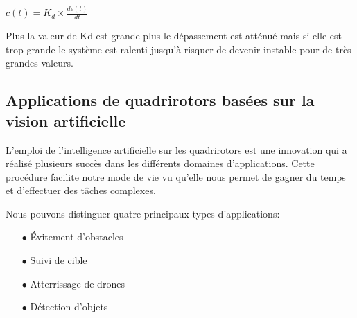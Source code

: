 $ c(t)  = K_d\times\frac{d\epsilon(t)}{dt}$


Plus la valeur de Kd est grande plus le dépassement est atténué mais si elle est trop grande le
système est ralenti jusqu'à risquer de devenir instable pour de très grandes valeurs.
\subsection{Applications de quadrirotors basées sur la vision artificielle}
L'emploi de l'intelligence artificielle sur les quadrirotors est une innovation qui a réalisé plusieurs succès dans les différents domaines d'applications. Cette procédure facilite notre mode de vie vu qu'elle nous permet de gagner du temps et d'effectuer des tâches complexes.

Nous pouvons distinguer quatre principaux types d'applications:   
\begin{itemize}
\item[$\bullet$]Évitement d'obstacles 
\item[$\bullet$] Suivi de cible
\item[$\bullet$] Atterrissage de drones 
\item[$\bullet$] Détection d'objets 
\end{itemize}
\vspace{0.5cm}
